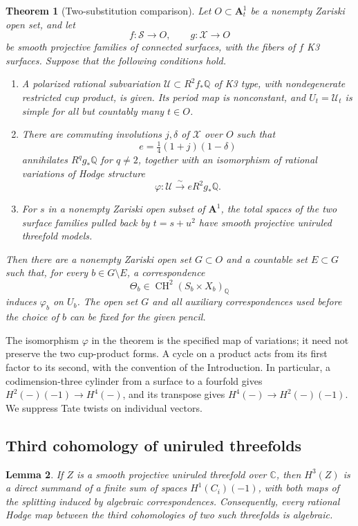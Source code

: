 \documentclass[11pt]{amsart}
\newcommand{\Q}{\mathbb Q}
\newcommand{\C}{\mathbb C}
\renewcommand{\AA}{\mathbf A}
\DeclareMathOperator{\CH}{CH}
\newtheorem{theorem}{Theorem}[section]
\newtheorem{lemma}[theorem]{Lemma}
\theoremstyle{definition}
\theoremstyle{remark}
\numberwithin{equation}{section}
\begin{document}
\begin{theorem}[Two-substitution comparison]\label{comp:twosquares}
Let $O\subset\AA^1_t$ be a nonempty Zariski open set, and let
\[
 f:\mathcal S\longrightarrow O,
 \qquad g:\mathcal X\longrightarrow O
\]
be smooth projective families of connected surfaces, with the fibers of
$f$ K3 surfaces.  Suppose that the following conditions hold.
\begin{enumerate}
\item A polarized rational subvariation $\mathscr U\subset R^2f_*\Q$ of
K3 type, with nondegenerate restricted cup product, is given.
Its period map is nonconstant, and $U_t=\mathscr U_t$ is simple for all
but countably many $t\in O$.
\item There are commuting involutions $j,\delta$ of $\mathcal X$ over
$O$ such that
\[
 e=\tfrac14(1+j)(1-\delta)
\]
annihilates $R^qg_*\Q$ for $q\ne2$, together with an isomorphism of
rational variations of Hodge structure
\[
 \varphi:\mathscr U\xrightarrow{\sim}eR^2g_*\Q.
\]
\item For $s$ in a nonempty Zariski open subset of $\AA^1$, the total
spaces of the two surface families pulled back by $t=s+u^2$ have smooth projective uniruled
threefold models.
\end{enumerate}
Then there are a nonempty Zariski open set $G\subset O$ and a countable
set $E\subset G$ such that, for every $b\in G\setminus E$, a correspondence
\[
 \Theta_b\in\CH^2(S_b\times X_b)_\Q
\]
induces $\varphi_b$ on $U_b$.  The open set $G$ and all auxiliary
correspondences used before the choice of $b$ can be fixed for the given
pencil.
\end{theorem}

The isomorphism $\varphi$ in the theorem is the specified map of
variations; it need not preserve the two cup-product forms.
A cycle on a product acts from its first factor to its second, with the
convention of the Introduction.  In particular, a codimension-three
cylinder from a surface to a fourfold gives
$H^2(-)(-1)\to H^4(-)$, and its transpose gives
$H^4(-)\to H^2(-)(-1)$.  We suppress Tate twists on individual vectors.

\subsection{Third cohomology of uniruled threefolds}

\begin{lemma}\label{comp:uniruled}
If $Z$ is a smooth projective uniruled threefold over $\C$, then $H^3(Z)$
is a direct summand of a finite sum of spaces $H^1(C_i)(-1)$, with both
maps of the splitting induced by algebraic correspondences.  Consequently,
every rational Hodge map between the third cohomologies of two such
threefolds is algebraic.
\end{lemma}
\end{document}
